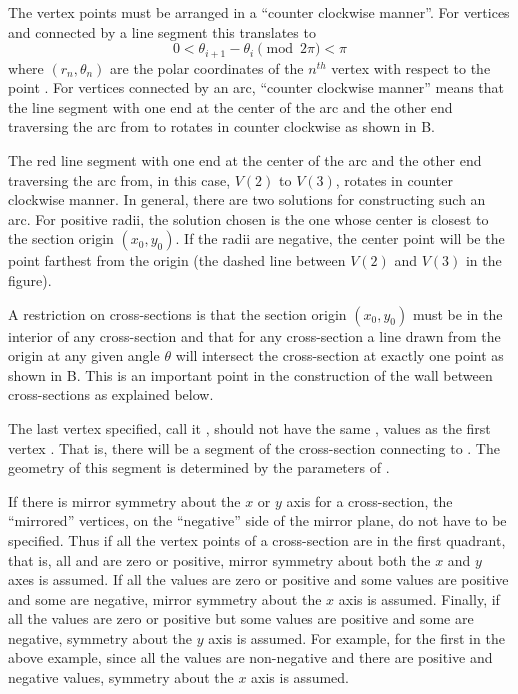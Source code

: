 The vertex points must be arranged in a ``counter clockwise manner''.  For vertices  and
 connected by a line segment this translates to
\begin{equation}
  0 < \theta_{i+1} - \theta_{i} \pmod{2\pi} < \pi
  \label{0tt2p}
\end{equation}
where $(r_n, \theta_n)$ are the polar coordinates of the $n^{th}$ vertex with respect to the point
. For vertices connected by an arc, ``counter clockwise manner'' means that the line segment
with one end at the center of the arc and the other end traversing the arc from  to
 rotates in counter clockwise as shown in B.

The red line segment with one end at the center of the arc and the other end traversing the arc
from, in this case, $V(2)$ to $V(3)$, rotates in counter clockwise manner. In general, there are two
solutions for constructing such an arc. For positive radii, the solution chosen is the one whose
center is closest to the section origin $(x_0, y_0)$. If the radii are negative, the center point
will be the point farthest from the origin (the dashed line between $V(2)$ and $V(3)$ in the
figure).

A restriction on cross-sections is that the section origin $(x_0, y_0)$ must be in the interior of
any cross-section and that for any cross-section a line drawn from the origin at any given angle
$\theta$ will intersect the cross-section at exactly one point as shown in
B. This is an important point in the construction of the wall between
cross-sections as explained below.

The last vertex specified, call it , should not have the same ,  values
as the first vertex . That is, there will be a segment of the cross-section connecting
 to . The geometry of this segment is determined by the parameters of
.

If there is mirror symmetry about the $x$ or $y$ axis for a cross-section, the ``mirrored''
vertices, on the ``negative'' side of the mirror plane, do not have to be specified. Thus if all the
vertex points of a cross-section are in the first quadrant, that is, all  and  are
zero or positive, mirror symmetry about both the $x$ and $y$ axes is assumed. If all the 
values are zero or positive and some  values are positive and some are negative, mirror
symmetry about the $x$ axis is assumed. Finally, if all the  values are zero or positive but
some  values are positive and some are negative, symmetry about the $y$ axis is assumed. For
example, for the first in the above example, since all the  values are non-negative and
there are positive and negative  values, symmetry about the $x$ axis is assumed.

